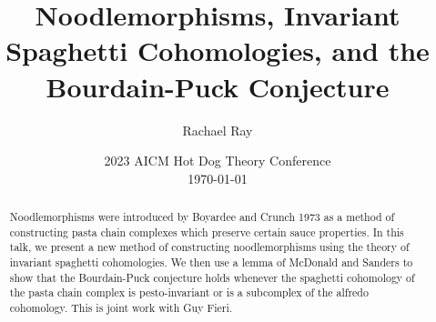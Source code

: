 \documentclass[12pt,notitlepage]{report}
\begin{document}
\title{
	Noodlemorphisms, Invariant Spaghetti Cohomologies,
	and the Bourdain-Puck Conjecture
}

\date{
	2023 AICM Hot Dog Theory Conference
	\\[12pt]
	\today
}

\author[1]{Rachael Ray}


\maketitle

\begin{abstract}
	Noodlemorphisms were introduced by Boyardee and Crunch 1973 as a method of
	constructing pasta chain complexes which preserve certain sauce properties.
	In this talk, we present a new method of constructing noodlemorphisms using
	the theory of invariant spaghetti cohomologies.
	We then use a lemma of McDonald and Sanders to show that the Bourdain-Puck
	conjecture holds whenever the spaghetti cohomology of the pasta chain
	complex is pesto-invariant or is a subcomplex of the alfredo cohomology.
	This is joint work with Guy Fieri.
\end{abstract}

\end{document}
